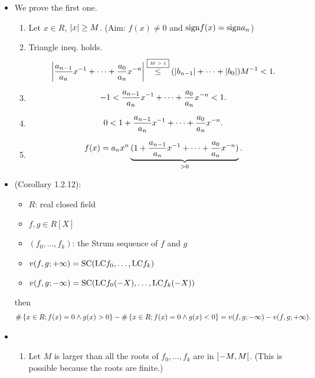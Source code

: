 \documentclass[9pt]{ltjsarticle}
\begin{document}
\begin{itemize}
\begin{itemize}
  \end{itemize}
  \item
  \pf We prove the first one.
  \begin{enumerate}
    \item Let $x\in R$, $\left|x\right|\ge M$.  (Aim: $f(x)\neq 0$ and $\mathrm{sign} f(x) = \mathrm{sign} a_n$)
    \item
    Triangle ineq. holds.
    \begin{align}
      \left|\frac{a_{n-1}}{a_n} x^{-1} + \dots + \frac{a_0}{a_n}x^{-n}\right|
      \overset{\text{\fbox{\tiny $M>1$}}}{\le}
      (\left|b_{n-1}\right|+\dots + \left|b_0\right|)M^{-1} < 1.
    \end{align}
    \item
    \begin{align}
      -1 < \frac{a_{n-1}}{a_n} x^{-1} + \dots + \frac{a_0}{a_n}x^{-n} < 1.
    \end{align}
    \item
    \begin{align}
      0 < 1+\frac{a_{n-1}}{a_n} x^{-1} + \dots + \frac{a_0}{a_n}x^{-n}.
    \end{align}
    \item
    \begin{align}
      f(x) = a_n x^n \underbrace{(1+\frac{a_{n-1}}{a_n} x^{-1} + \dots + \frac{a_0}{a_n}x^{-n})}_{>0}.
    \end{align}
  \end{enumerate}
  \item
  (Corollary 1.2.12):
  \begin{itemize}
    \item $R$: real closed field
    \item $f,g \in R[X]$
    \item $(f_0,\dots,f_k)$: the Strum sequence of $f$ and $g$
    \item $v(f,g;+\infty) = \mathrm{SC} ({\rm LC} f_0,\dots,{\rm LC} f_k)$
    \item $v(f,g;-\infty) = \mathrm{SC} ({\rm LC} f_0(-X),\dots,{\rm LC} f_k (-X))$
  \end{itemize}
  then
  \begin{align}
    \# \left\{x\in R; f(x)=0 \land g(x)>0\right\} - \# \left\{x\in R; f(x)=0 \land g(x)<0\right\}
    =
    v(f,g;-\infty) - v(f,g;+\infty).
  \end{align}
  \item
  \pf
  \begin{enumerate}
    \item
    Let $M$ is larger than all the roots of $f_0,\dots,f_k$ are in $\left] -M,M \right[$.
    (This is possible because the roots are finite.)

\end{enumerate}
\end{itemize}
\end{document}
